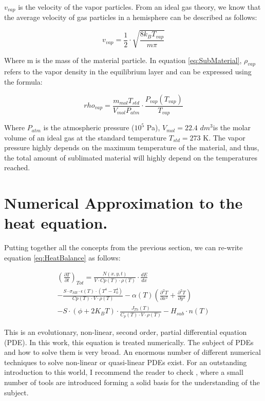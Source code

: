 $v_{vap}$ is the velocity of the vapor particles. From an ideal gas theory, we know that the average velocity of gas particles in a hemisphere can be described as follows: 

\begin{equation}
    v_{vap} = \frac{1}{2}\cdot \sqrt{\frac{8k_B T_{vap}}{m \pi}}
\end{equation}

Where m is the mass of the material particle. In equation \ref{eq:SubMaterial}, $\rho_{vap}$ refers to the vapor density in the equilibrium layer and can be expressed using the formula: 

\begin{equation}
    rho_{vap} = \frac{m_{mol} T_{std}}{V_{mol} P_{atm}}\cdot \frac{P_{vap}(T_{vap})}{T_{vap}}
\end{equation}

Where $P_{atm}$ is the atmospheric pressure ($10^5$ Pa), $V_{mol} = 22.4$ $dm^3$is the molar volume of an ideal gas at the standard temperature $T_{std} = 273$ K. The vapor pressure highly depends on the maximum temperature of the material, and thus, the total amount of sublimated material will highly depend on the temperatures reached. 

\section{Numerical Approximation to the heat equation.}

Putting together all the concepts from the previous section, we can re-write equation \ref{eq:HeatBalance} as follows: 

\begin{multline}
    \left(\frac{\partial T}{\partial t}\right)_{Tot} = 
    \frac{N(x,y,t)}{V\cdot Cp(T) \cdot \rho (T) }\cdot \frac{dE}{dx} \\
    - \frac{S\cdot \sigma_{SB}\cdot \epsilon(T)\cdot \left(T^4 - T_0^4\right)}{Cp(T)\cdot V \cdot \rho(T)} 
        -\alpha (T) \left( \frac{\partial^2 T}{\partial x^2} + \frac{\partial^2 T}{\partial y^2} \right)  \\
        - S\cdot \left( \phi +2K_B T\right)\cdot \frac{J_{Th}(T)}{C_p(T)\cdot V \cdot \rho(T)} - H_{sub} \cdot n(T)
    \label{eq:ExplicitHeatEq}
\end{multline}

This is an evolutionary, non-linear, second order, partial differential equation (PDE). In this work, this equation is treated numerically. The subject of PDEs and how to solve them is very broad. An enormous number of different numerical techniques to solve non-linear or quasi-linear PDEs exist. For an outstanding introduction to this world, I recommend the reader to check \parencite[][]{ref:NumericalMethodBook}, where a small number of tools are introduced forming a solid basis for the understanding of the subject. 

